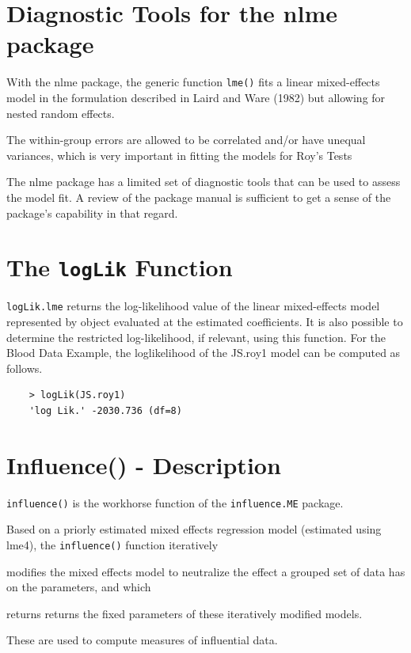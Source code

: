 \documentclass[12pt, a4paper]{report}
\theoremstyle{plain}
\theoremstyle{definition}
\theoremstyle{remark}
\begin{document}
\section{Diagnostic Tools for the nlme package}


With the nlme package, the generic function \texttt{lme()} fits a linear mixed-effects model in the formulation described in Laird and Ware (1982) but allowing for nested random effects. 

The within-group errors are allowed to be correlated and/or have unequal variances, which is very important in fitting the models for Roy's Tests

The nlme package has a limited set of diagnostic tools that can be used to assess the model fit. A review of the package manual is sufficient to get a sense of the package's capability in that regard.




\section{The \texttt{logLik} Function}
\texttt{logLik.lme} returns the log-likelihood value of the linear mixed-effects model represented by object evaluated at the estimated coefficients. It is also possible to determine the restricted log-likelihood, if relevant, using this function. For the Blood Data Example,  the loglikelihood of the JS.roy1 model can be computed as follows.
\begin{framed}
	\begin{verbatim}
	> logLik(JS.roy1)
	'log Lik.' -2030.736 (df=8)
	\end{verbatim}
\end{framed}


\section{Influence() - Description}
\texttt{influence()} is the workhorse function of the \texttt{influence.ME} package. 


Based on a priorly estimated mixed effects regression model (estimated using lme4), the \texttt{influence()} function iteratively 

modifies the mixed effects model to neutralize the effect a grouped set of data has on the parameters, and which 

returns returns the fixed parameters of these iteratively modified models. 

These are used to compute measures of influential data.
\end{document}
